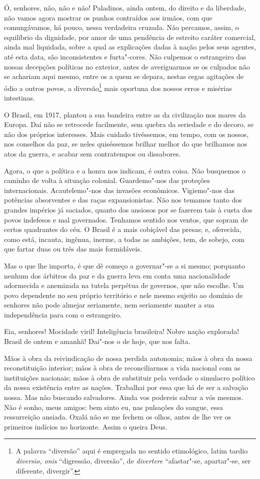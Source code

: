 Ó, senhores, não, não e não! Paladinos, ainda ontem, do direito e
da liberdade, não vamos agora mostrar os punhos contraídos aos irmãos,
com que comungávamos, há pouco, nessa verdadeira cruzada. Não percamos,
assim, o equilíbrio da dignidade, por amor de uma pendência de estreito
caráter comercial, ainda mal liquidada, sobre a qual as explicações
dadas à nação pelos seus agentes, até esta data, são inconsistentes e
furta"-cores. Não culpemos o estrangeiro das nossas decepções políticas
no exterior, antes de averiguarmos se os culpados não se achariam aqui
mesmo, entre os a quem se depara, nestas cegas agitações de ódio a
outros povos, a diversão\footnote{ A palavra ``diversão'' aqui é
empregada no sentido etimológico, latim tardio \textit{diversio, onis}
``digressão, diversão'', de \textit{divertere} ``afastar"-se, apartar"-se, ser
diferente, divergir''.} mais oportuna dos nossos erros e misérias intestinas.

O Brasil, em 1917, plantou a sua bandeira entre as da civilização
nos mares da Europa. Daí não se retrocede facilmente, sem quebra da
seriedade e do decoro, se não dos próprios interesses. Mais cuidado
tivéssemos, em tempo, com os nossos, nos conselhos da paz, se neles
quiséssemos brilhar melhor do que brilhamos nos atos da guerra, e
acabar sem contratempos ou dissabores.

Agora, o que a política e a honra nos indicam, é outra coisa. Não
busquemos o caminho de volta à situação colonial. Guardemo"-nos das
proteções internacionais. Acautelemo"-nos das invasões econômicos.
Vigiemo"-nos das potências absorventes e das raças expansionistas. Não
nos temamos tanto dos grandes impérios já saciados, quanto dos ansiosos
por se fazerem tais à custa dos povos indefesos e mal governados.
Tenhamos sentido nos ventos, que sopram de certos quadrantes do céu. O
Brasil é a mais cobiçável das presas; e, oferecida, como está, incauta,
ingênua, inerme, a todas as ambições, tem, de sobejo, com que fartar
duas ou três das mais formidáveis.

Mas o que lhe importa, é que dê começo a governar"-se a si mesmo;
porquanto nenhum dos árbitros da paz e da guerra leva em conta uma
nacionalidade adormecida e anemizada na tutela perpétua de governos,
que não escolhe. Um povo dependente no seu próprio território e nele
mesmo sujeito ao domínio de senhores não pode almejar seriamente, nem
seriamente manter a sua independência para com o estrangeiro.

Eia, senhores! Mocidade viril! Inteligência brasileira! Nobre
nação explorada! Brasil de ontem e amanhã! Dai"-nos o de hoje, que nos falta.

Mãos à obra da reivindicação de nossa perdida autonomia; mãos à
obra da nossa reconstituição interior; mãos à obra de reconciliarmos a
vida nacional com as instituições nacionais; mãos à obra de substituir
pela verdade o simulacro político da nossa existência entre as nações.
Trabalhai por essa que há de ser a salvação nossa. Mas não buscando
salvadores. Ainda vos podereis salvar a vós mesmos. Não é sonho, meus
amigos: bem sinto eu, nas pulsações do sangue, essa ressurreição
ansiada. Oxalá não se me fechem os olhos, antes de lhe ver os primeiros
indícios no horizonte. Assim o queira Deus.

